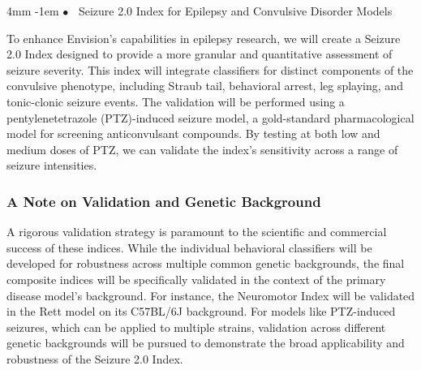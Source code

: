 \documentclass[11pt,a4paper]{article}
\makeatletter
\renewcommand\paragraph{%
  \@startsection{paragraph}{4}{\z@}%
    {4mm}%
    {-1em}%
    {\normalfont\normalsize\bfseries$\bullet$~}%
}
\makeatother
\begin{document}
\paragraph{Seizure 2.0 Index for Epilepsy and Convulsive Disorder Models}

To enhance Envision’s capabilities in epilepsy research, we will create a Seizure 2.0 Index designed to provide a more granular and quantitative assessment of seizure severity. This index will integrate classifiers for distinct components of the convulsive phenotype, including Straub tail, behavioral arrest, leg splaying, and tonic-clonic seizure events. The validation will be performed using a pentylenetetrazole (PTZ)-induced seizure model, a gold-standard pharmacological model for screening anticonvulsant compounds. By testing at both low and medium doses of PTZ, we can validate the index’s sensitivity across a range of seizure intensities.

\subsubsection{A Note on Validation and Genetic Background}

A rigorous validation strategy is paramount to the scientific and commercial success of these indices. While the individual behavioral classifiers will be developed for robustness across multiple common genetic backgrounds, the final composite indices will be specifically validated in the context of the primary disease model’s background. For instance, the Neuromotor Index will be validated in the Rett model on its C57BL/6J background. For models like PTZ-induced seizures, which can be applied to multiple strains, validation across different genetic backgrounds will be pursued to demonstrate the broad applicability and robustness of the Seizure 2.0 Index.
\end{document}
